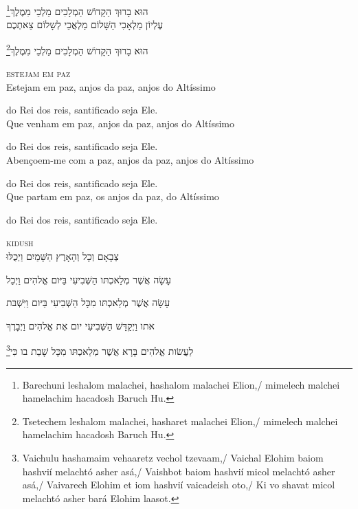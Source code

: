 \footnote{Barechuni leshalom malachei, hashalom malachei Elion,/
mimelech malchei hamelachim hacadosh Baruch Hu.}הוּא בָרוּךְ הַקָדוֹשׁ הַמְלָכִים מַלְכֵי מִמֶלֶךְ\\[10pt] 

עֶלְיוֹן מַלְאָכִי הַשָּׁלוֹם מַלְאֲכֵי לְשָלוֹם צֵאתְכֶם 

\footnote{Tsetechem leshalom malachei, hasharet malachei Elion,/
mimelech malchei hamelachim hacadosh Baruch Hu.}הוּא בָרוּךְ הַקָדוֹשׁ הַמְלָכִים מַלְכֵי מִמֶלֶךְ


\movetooddpage
\raggedright

\vspace*{1cm}

\textsc{estejam em paz}\\[15pt]


Estejam em paz, anjos da paz, anjos do Altíssimo

do Rei dos reis, santificado seja Ele.\\[10pt]

Que venham em paz, anjos da paz, anjos do Altíssimo

do Rei dos reis, santificado seja Ele.\\[10pt]

Abençoem-me com a paz, anjos da paz, \qb{}anjos do Altíssimo

do Rei dos reis, santificado seja Ele.\\[10pt]

Que partam em paz, os anjos da paz, \qb{}do Altíssimo

do Rei dos reis, santificado seja Ele.\\[10pt]


\movetoevenpage
\raggedleft


\vspace*{1cm}

\textsc{kidush}\\[15pt]

צְבָאָם וְכָל וְהָאָרֶץ הַשָּׁמַיִם וַיְכֻלּוּ 

עָשָׂה אֲשֶׁר מְלַאכְתּו הַשְּׁבִיעִי בַּיּום אֱלהִים וַיְכַל 

עָשָׂה אֲשֶׁר מְלַאכְתּו מִכָּל הַשְּׁבִיעִי בַּיּום וַיִּשְׁבּת 

אתו וַיְקַדֵּשׁ הַשְּׁבִיעִי יום אֶת אֱלהִים וַיְבָרֶךְ 

\footnote{Vaichulu hashamaim vehaaretz vechol tzevaam,/
Vaichal Elohim baiom hashvií melachtó asher asá,/
Vaishbot baiom hashvií micol melachtó asher asá,/
Vaivarech Elohim et iom hashvií vaicadeish oto,/
Ki vo shavat micol melachtó asher bará Elohim laasot.}לַעֲשׂות אֱלהִים בָּרָא אֲשֶׁר מְלַאכְתּו מִכָּל שָׁבַת בו כִּי\\[10pt] 

